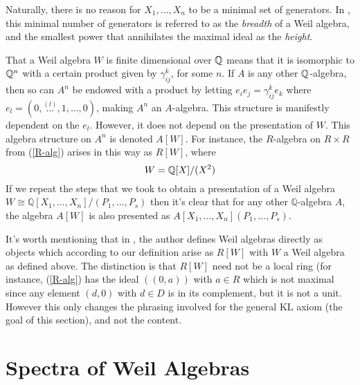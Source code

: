 Naturally, there is no reason for \( X_1,\dots,X_n \) to be a minimal set of generators. In \cite{lav96}, this minimal number of generators is referred to as the \emph{breadth} of a Weil algebra, and the smallest power that annihilates the maximal ideal as the \emph{height}.

That a Weil algebra \( W \) is finite dimensional over \( \mathbb{Q} \) means that it is isomorphic to \( \mathbb{Q}^n \) with a certain product given by \( \gamma_{ij}^k \), for some \( n \). If \( A \) is any other \( \mathbb{Q} \)-algebra, then so can \( A^n \) be endowed with a product by letting \( e_ie_j = \gamma_{ij}^ke_k \) where \( e_l = (0,\stackrel{(l)}{\dots},1,\dots,0) \), making \( A^n \) an \( A \)-algebra. This structure is manifestly dependent on the \( e_l \). However, it does not depend on the presentation of \( W \). This algebra structure on \( A^n \) is denoted \( A[W] \). For instance, the \( R \)-algebra on \( R\times R \) from (\ref{R-alg}) arises in this way as \( R[W] \), where
\begin{equation*}
  W = \mathbb{Q}[X]/(X^2)
\end{equation*}
If we repeat the steps that we took to obtain a presentation of a Weil algebra \( W \cong \mathbb{Q}[X_1,\dots,X_n]/(P_1,\dots,P_s) \) then it's clear that for any other \( \mathbb{Q} \)-algebra \( A \), the algebra \( A[W] \) is also presented as \( A[X_1,\dots,X_n](P_1,\dots,P_s) \).

It's worth mentioning that in \cite{lav96}, the author defines Weil algebras directly as objects which according to our definition arise as \( R[W] \) with \( W \) a Weil algebra as defined above. The distinction is that \( R[W] \) need not be a local ring (for instance, (\ref{R-alg}) has the ideal \( ((0,a)) \) with \( a\in R \) which is not maximal since any element \( (d,0) \) with \( d\in D \) is in its complement, but it is not a unit. However this only changes the phrasing involved for the general KL axiom (the goal of this section), and not the content.

\section{Spectra of Weil Algebras}

